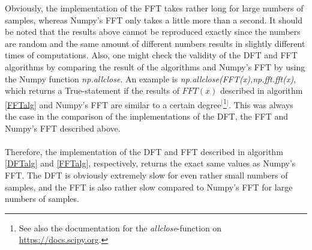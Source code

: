 Obviously, the implementation of the FFT takes rather long for large numbers of samples, whereas Numpy's FFT only takes a little more than a second. It should be noted that the results above cannot be reproduced exactly since the numbers are random and the same amount of different numbers results in slightly different times of computations. Also, one might check the validity of the DFT and FFT algorithms by comparing the result of the algorithms and Numpy's FFT by using the Numpy function \textit{np.allclose}. An example is \textit{np.allclose(FFT(x),np.fft.fft(x)}, which returns a True-statement if the results of $FFT(x)$ described in algorithm \ref{FFTalg} and Numpy's FFT are similar to a certain degree$^[$\footnote{See also the documentation for the \textit{allclose}-function on \href{https://docs.scipy.org/doc/numpy/reference/generated/numpy.allclose.html}{https://docs.scipy.org}.}$^]$. This was always the case in the comparison of the implementations of the DFT, the FFT and Numpy's FFT described above.
\\ \\
Therefore, the implementation of the DFT and FFT described in algorithm \ref{DFTalg} and \ref{FFTalg}, respectively, returns the exact same values as Numpy's FFT. The DFT is obviously extremely slow for even rather small numbers of samples, and the FFT is also rather slow compared to Numpy's FFT for large numbers of samples.